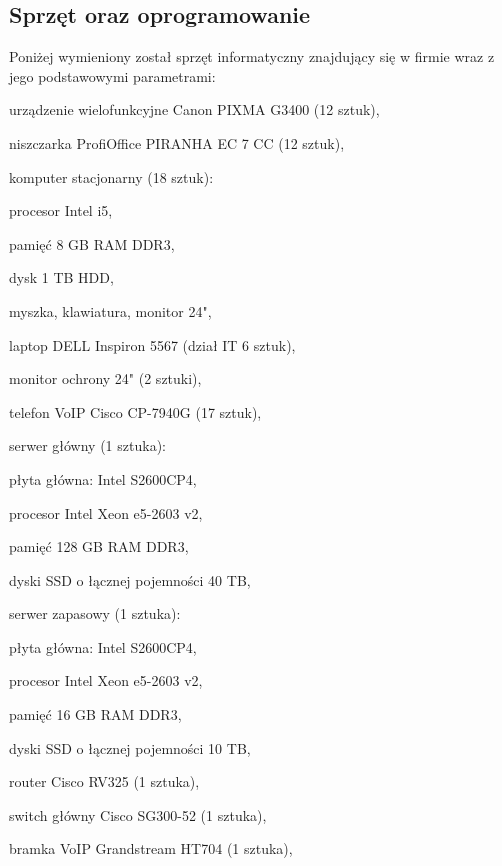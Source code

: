 \subsection{Sprzęt oraz oprogramowanie}
Poniżej wymieniony został sprzęt informatyczny znajdujący się w firmie wraz z jego podstawowymi parametrami:
\hspace{-0.5cm}\begin{minipage}{13.5cm}
\begin{itemize*}
	\item urządzenie wielofunkcyjne Canon PIXMA G3400 (12 sztuk),
	\item niszczarka ProfiOffice PIRANHA EC 7 CC (12 sztuk),
	\item komputer stacjonarny (18 sztuk):
	\begin{itemize*}
		\item procesor Intel i5,
		\item pamięć 8 GB RAM DDR3,
		\item dysk 1 TB HDD,
		\item myszka, klawiatura, monitor 24",
	\end{itemize*}
	\item laptop DELL Inspiron 5567 (dział IT 6 sztuk),
	\item monitor ochrony 24" (2 sztuki),
	\item telefon VoIP Cisco CP-7940G (17 sztuk),
	\item serwer główny (1 sztuka):
	\begin{itemize*}
		\item płyta główna: Intel S2600CP4,
		\item procesor Intel Xeon e5-2603 v2,
		\item pamięć 128 GB RAM DDR3,
		\item dyski SSD o łącznej pojemności 40 TB, 
	\end{itemize*}
	\item serwer zapasowy (1 sztuka):
	\begin{itemize*}
		\item płyta główna: Intel S2600CP4,
		\item procesor Intel Xeon e5-2603 v2,
		\item pamięć 16 GB RAM DDR3,
		\item dyski SSD o łącznej pojemności 10 TB, 
	\end{itemize*}
	\item router Cisco RV325 (1 sztuka),
	\item switch główny Cisco SG300-52 (1 sztuka),
	\item bramka VoIP Grandstream HT704 (1 sztuka),

\end{itemize*}
\end{minipage}
